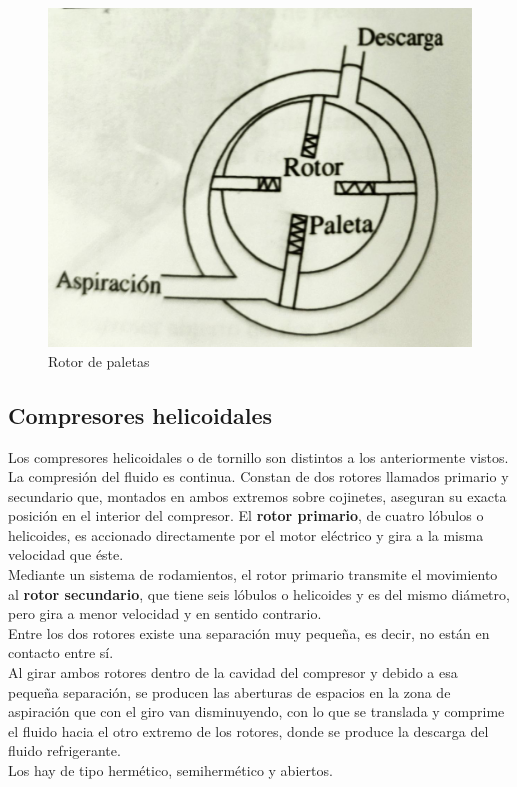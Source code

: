 \begin{figure}[H]
	\centering
	\includegraphics[width=.4\linewidth]{figuras/compresores/rotor de paletas.jpg}
	\caption{Rotor de paletas}
	\label{fig:Rotor de paletas}
\end{figure}

\subsection{Compresores helicoidales}

Los compresores helicoidales o de tornillo son distintos a los anteriormente vistos. La compresi\'on del fluido es continua. Constan de dos rotores llamados primario y secundario que, montados en ambos extremos sobre cojinetes, aseguran su exacta posici\'on en el interior del compresor. El \textbf{rotor primario}, de cuatro l\'obulos o helicoides, es accionado directamente por el motor el\'ectrico y gira a la misma velocidad que \'este.\\ Mediante un sistema de rodamientos, el rotor primario transmite el movimiento al \textbf{rotor secundario}, que tiene seis l\'obulos o helicoides y es del mismo di\'ametro, pero gira a menor velocidad y en sentido contrario.\\ Entre los dos rotores existe una separaci\'on muy pequeña, es decir, no est\'an en contacto entre s\'i.\\Al girar ambos rotores dentro de la cavidad del compresor y debido a esa pequeña separaci\'on, se producen las aberturas de espacios en la zona de aspiraci\'on que con el giro van disminuyendo, con lo que se translada y comprime el fluido hacia el otro extremo de los rotores, donde se produce la descarga del fluido refrigerante.\\ Los hay de tipo herm\'etico, semiherm\'etico y abiertos.
